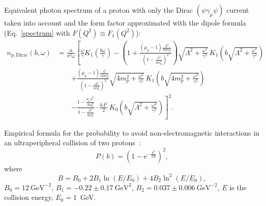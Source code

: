 \documentclass[a4paper,12pt]{article}
\begin{document}
Equivalent photon spectrum of a proton with only the Dirac $(\psi \gamma_\mu
\psi)$ current taken into account and the form factor approximated with the
dipole formula (Eq.~\eqref{spectrum} with $F(Q^2) \equiv F_1(Q^2)$):
\begin{equation}
  \begin{split}
    n_{p, \text{Dirac}}(b, \omega)
    &= \frac{\alpha}{\pi^2 \omega}
       \left[
           \frac{\omega}{\gamma} K_1 \left( \frac{b \omega}{\gamma} \right)
         - \left(
               1
             + \frac{(\mu_p - 1) \frac{\Lambda^4}{16 m_p^4}}{
                 \left( 1 - \frac{\Lambda^2}{4 m_p^2} \right)^2
               }
           \right)
           \sqrt{\Lambda^2 + \frac{\omega^2}{\gamma^2}}
           \, K_1 \left( b \sqrt{\Lambda^2 + \frac{\omega^2}{\gamma^2}} \right)
    \right. \\ &\qquad \left.
         + \frac{(\mu_p - 1) \frac{\Lambda^4}{16 m_p^4}}{
             \left( 1 - \frac{\Lambda^2}{4 m_p^2}  \right)^2
           }
           \sqrt{4 m_p^2 + \frac{\omega^2}{\gamma^2}}
           \, K_1 \left( b \sqrt{4 m_p^2 + \frac{\omega^2}{\gamma^2}} \right)
    \right. \\ &\qquad \left.
         - \frac{1 - \frac{\mu_p \Lambda^2}{4 m_p^2}}
                {1 - \frac{\Lambda^2}{4 m_p^2}}
         \cdot
           \frac{b \Lambda^2}{2}
           \, K_0 \left( b \sqrt{\Lambda^2 + \frac{\omega^2}{\gamma^2}} \right)
       \right]^2.
  \end{split}
\end{equation}

Empirical formula for the probability to avoid non-electromagnetic interactions
in an ultraperipheral collision of two protons~\cite{hep-ph-0608271}:
\begin{equation}
  P(b) = \left( 1 - \mathrm{e}^{-\frac{b^2}{2B}} \right)^2,
\end{equation}
where~\cite{1112.3243}
\begin{equation}
  B = B_0 + 2 B_1 \ln(E / E_0) + 4 B_2 \ln^2 (E / E_0),
\end{equation}
$B_0 = 12~\text{GeV}^{-2}$, $B_1 = -0.22 \pm 0.17~\text{GeV}^2$, $B_2 = 0.037
\pm 0.006~\text{GeV}^{-2}$, $E$ is the collision energy, $E_0 = 1$~GeV.
\end{document}
